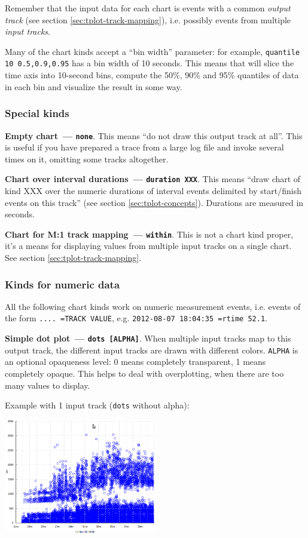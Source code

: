 \documentclass{article}
\begin{document}
Remember that the input data for each chart is events with a common \emph{output track} (see section \ref{sec:tplot-track-mapping}), i.e. possibly events from multiple \emph{input tracks}.

Many of the chart kinds accept a ``bin width'' parameter: for example, \texttt{quantile 10 0.5,0.9,0.95} has a bin width of 10 seconds. This means that \timeplot{} will slice the time axis into 10-second bins, compute the 50\%, 90\% and 95\% quantiles of data in each bin and visualize the result in some way.

\subsubsection{Special kinds}
\noindent
\textbf{Empty chart~--- \texttt{none}}. This means ``do not draw this output track at all''. This is useful if you have prepared a trace from a large log file and invoke \timeplot{} several times on it, omitting some tracks altogether.

\noindent
\textbf{Chart over interval durations~--- \texttt{duration XXX}}. This means ``draw chart of kind XXX over the numeric durations of interval events delimited by start/finish events on this track'' (see section \ref{sec:tplot-concepts}). Durations are measured in seconds.

\noindent
\textbf{Chart for M:1 track mapping~--- \texttt{within}}. This is not a chart kind proper, it's a means for displaying values from multiple input tracks on a single chart. See section \ref{sec:tplot-track-mapping}.

\pagebreak
\subsubsection{Kinds for numeric data}
All the following chart kinds work on numeric measurement events, i.e. events of the form \texttt{.... =TRACK VALUE}, e.g. \texttt{2012-08-07 18:04:35 =rtime 52.1}.

\noindent
\textbf{Simple dot plot~--- \texttt{dots [ALPHA]}}. When multiple input tracks map to this output track, the different input tracks are drawn with different colors. \texttt{ALPHA} is an optional opaqueness level: 0 means completely transparent, 1 means completely opaque. This helps to deal with overplotting, when there are too many values to display.

Example with 1 input track (\texttt{dots} without alpha):

{\centering \includegraphics[width=0.5\textwidth]{pics/tplot/dots.png}}
\end{document}

